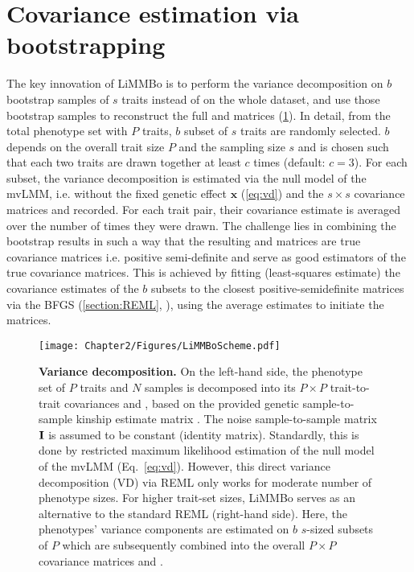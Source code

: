 \section{Covariance estimation via bootstrapping}
\label{section:bootstrapping-limmbo}
The key innovation of LiMMBo is to perform the variance decomposition on \(b\) bootstrap samples of \(s\) traits instead of on the whole dataset, and use those bootstrap samples to reconstruct the full  and  matrices (\cref{fig:vd}). In detail, from the total phenotype set with \(P\) traits, \(b\) subset of \(s\) traits are randomly selected. \(b\) depends on the overall trait size \(P\) and the sampling size \(s\) and is chosen such that each two traits are drawn together at least \(c\) times (default: \(c=3\)). For each subset, the variance decomposition is estimated via the null model of the mvLMM, i.e. without the fixed genetic effect \(\mathbf{x}\) (\cref{eq:vd}) and the $s \times s$ covariance matrices  and recorded.  For each trait pair, their covariance estimate is averaged over the number of times they were drawn. The challenge lies in combining the bootstrap results in such a way that the resulting  and  matrices are true covariance matrices i.e. positive semi-definite and serve as good estimators of the true covariance matrices. This is achieved by fitting (least-squares estimate) the covariance estimates of the \(b\) subsets to the closest positive-semidefinite matrices via the BFGS (\cref{section:REML}, \citep{Byrd1995}), using the average estimates to initiate the matrices. 

\begin{figure}[hbtp]
	\centering
	\texttt{[image: Chapter2/Figures/LiMMBoScheme.pdf]}
	\caption[\textbf{Variance decomposition.}]{\textbf{Variance decomposition.} On the left-hand side, the phenotype set of \(P\) traits and \(N\) samples is decomposed into its \(P \times P\) trait-to-trait covariances  and , based on the provided genetic sample-to-sample kinship estimate matrix . The noise sample-to-sample matrix \(\boldsymbol{\mathbf{I}}\) is assumed to be constant (identity matrix). Standardly, this is done by restricted maximum likelihood estimation of the null model of the mvLMM (Eq.~\ref{eq:vd}). However, this direct variance decomposition (VD) via REML only works for moderate number of phenotype sizes. For higher trait-set sizes, LiMMBo serves as an alternative to the standard REML (right-hand side). Here, the phenotypes' variance components are estimated on \(b\) \(s\)-sized subsets of \(P\) which are subsequently combined into the overall \(P \times P\) covariance matrices  and .} 
	 	\label{fig:vd}
\end{figure}


